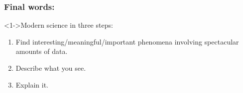 
\begin{frame}

  \frametitle{Final words:}

  \begin{block}<1->{Modern science in three steps:}
    \begin{enumerate}
    \item<1->
      Find interesting/meaningful/important phenomena
      involving spectacular amounts of data.
    \item<2->
      Describe what you see.
    \item<3->
      Explain it.
    \end{enumerate}
  \end{block}

\end{frame}

